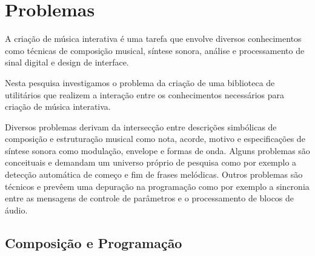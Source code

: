 \documentclass{ppgmus}
\begin{document}
\section{Problemas}





A criação de música interativa é uma tarefa que envolve diversos 
conhecimentos como técnicas de composição musical, síntese sonora,
análise e processamento de sinal digital e design de interface.

Nesta pesquisa investigamos o problema da criação de uma biblioteca
de utilitários que realizem a interação entre os conhecimentos necessários
para criação de música interativa.


Diversos problemas derivam da intersecção entre descrições simbólicas
de composição e estruturação musical como nota, acorde, motivo e 
especificações de síntese sonora como modulação, envelope e formas de onda.
Alguns problemas são conceituais e demandam um universo próprio de 
pesquisa como por exemplo a detecção automática de começo e fim de
frases melódicas. Outros problemas são técnicos e prevêem uma depuração
na programação como por exemplo a sincronia entre as mensagens de controle de parâmetros
e o processamento de blocos de áudio. 



\subsection{Composição e Programação}
  


\end{document}
